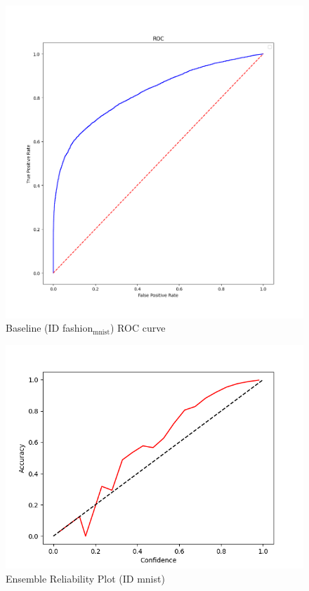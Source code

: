\documentclass[11pt]{article}
\begin{document}
\begin{figure}[htbp]
\centering
\includegraphics[width=.9\linewidth]{./base_fash_roc.png}
\caption{\label{fig:org42337be}
Baseline (ID fashion\(_{\text{mnist}}\)) ROC curve}
\end{figure}



\begin{figure}[htbp]
\centering
\includegraphics[width=.9\linewidth]{./ens_mnist_total_rel.png}
\caption{\label{fig:orgf37ac26}
Ensemble Reliability Plot (ID mnist)}
\end{figure}
\end{document}

